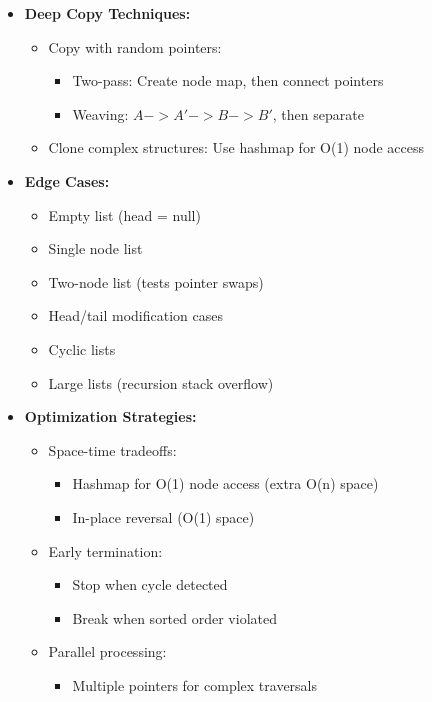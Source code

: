 \documentclass[a4paper,10pt]{book}
\begin{document}
\begin{itemize}
    \item \textbf{Deep Copy Techniques:}
    \begin{itemize}
        \item Copy with random pointers:
        \begin{itemize}
            \item Two-pass: Create node map, then connect pointers
            \item Weaving: $A->A'->B->B'$, then separate
        \end{itemize}
        \item Clone complex structures: Use hashmap for O(1) node access
    \end{itemize}
    
    \item \textbf{Edge Cases:}
    \begin{itemize}
        \item Empty list (head = null)
        \item Single node list
        \item Two-node list (tests pointer swaps)
        \item Head/tail modification cases
        \item Cyclic lists
        \item Large lists (recursion stack overflow)
    \end{itemize}
    
    \item \textbf{Optimization Strategies:}
    \begin{itemize}
        \item Space-time tradeoffs:
        \begin{itemize}
            \item Hashmap for O(1) node access (extra O(n) space)
            \item In-place reversal (O(1) space)
        \end{itemize}
        \item Early termination:
        \begin{itemize}
            \item Stop when cycle detected
            \item Break when sorted order violated
        \end{itemize}
        \item Parallel processing:
        \begin{itemize}
            \item Multiple pointers for complex traversals
        \end{itemize}
    \end{itemize}
    

\end{itemize}
\end{document}
